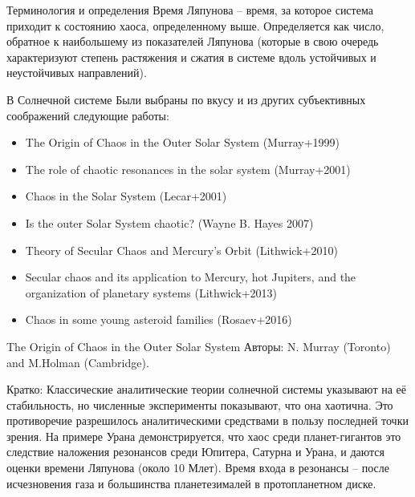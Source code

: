 \documentclass{beamer}
\begin{document}
\begin{frame}{Терминология и определения}
        Время Ляпунова -- время, за которое система приходит к состоянию хаоса, определенному выше. Определяется как число, обратное к наибольшему из показателей Ляпунова (которые в свою очередь характеризуют степень растяжения и сжатия в системе вдоль устойчивых и неустойчивых направлений).

\end{frame}


\begin{frame}{В Солнечной системе}
        Были выбраны по вкусу и из других субъективных соображений следующие работы:
        \begin{itemize}
                \item The Origin of Chaos in the Outer Solar System (Murray+1999)
                \item The role of chaotic resonances in the solar system (Murray+2001)
                \item Chaos in the Solar System (Lecar+2001)
                \item Is the outer Solar System chaotic? (Wayne B. Hayes 2007)
                \item Theory of Secular Chaos and Mercury's Orbit (Lithwick+2010)
                \item Secular chaos and its application to Mercury, hot Jupiters, and the organization of planetary systems (Lithwick+2013)
                \item Chaos in some young asteroid families (Rosaev+2016)
        \end{itemize}
\end{frame}




\begin{frame}{The Origin of Chaos in the Outer Solar System}
        Авторы: N. Murray (Toronto) and M.Holman (Cambridge).

        Кратко: Классические аналитические теории солнечной системы указывают на её стабильность, но численные эксперименты показывают, что она хаотична. Это противоречие разрешилось аналитическими средствами в пользу последней точки зрения. На примере Урана демонстрируется, что хаос среди планет-гигантов это следствие наложения резонансов среди Юпитера, Сатурна и Урана, и даются оценки времени Ляпунова (около 10 Млет). Время входа в резонансы -- после исчезновения газа и большинства планетезималей в протопланетном диске.
\end{frame}
\end{document}
